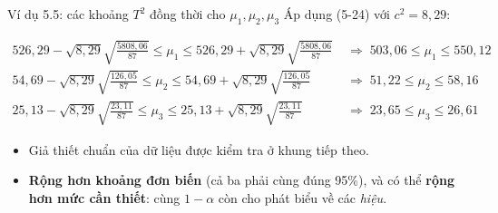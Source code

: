 \begin{frame}{Ví dụ 5.5: các khoảng $T^2$ đồng thời cho $\mu_1,\mu_2,\mu_3$}
Áp dụng (5-24) với $c^2=8{,}29$:

\begin{align*}
526{,}29 - \sqrt{8{,}29}\sqrt{\tfrac{5808{,}06}{87}} \le \mu_1 \le 526{,}29 + \sqrt{8{,}29}\sqrt{\tfrac{5808{,}06}{87}}
&\;\Rightarrow\; 503{,}06\le \mu_1\le 550{,}12\\[0.3ex]
54{,}69 - \sqrt{8{,}29}\sqrt{\tfrac{126{,}05}{87}} \le \mu_2 \le 54{,}69 + \sqrt{8{,}29}\sqrt{\tfrac{126{,}05}{87}}
&\;\Rightarrow\; 51{,}22\le \mu_2\le 58{,}16\\[0.3ex]
25{,}13 - \sqrt{8{,}29}\sqrt{\tfrac{23{,}11}{87}} \le \mu_3 \le 25{,}13 + \sqrt{8{,}29}\sqrt{\tfrac{23{,}11}{87}}
&\;\Rightarrow\; 23{,}65\le \mu_3\le 26{,}61
\end{align*}

\begin{itemize}
  \item Giả thiết chuẩn của dữ liệu được kiểm tra ở khung tiếp theo.
  \item \textbf{Rộng hơn khoảng đơn biến} (cả ba phải cùng đúng 95\%), và có
        thể \textbf{rộng hơn mức cần thiết}: cùng $1-\alpha$ còn cho phát biểu về các \emph{hiệu}.
\end{itemize}
\end{frame}

